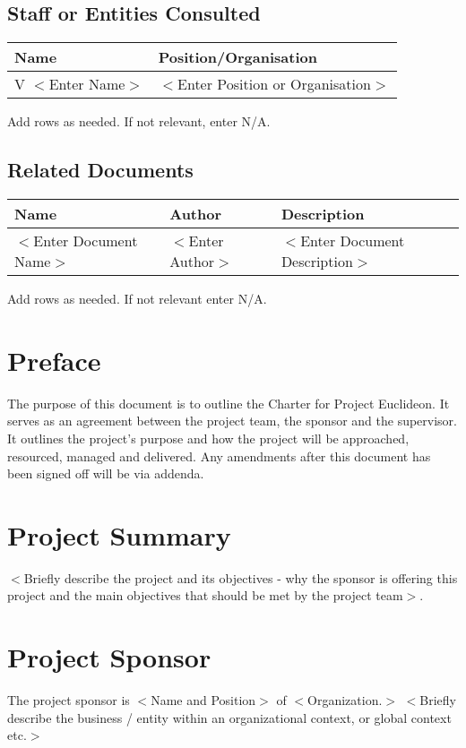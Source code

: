 \documentclass[a4paper]{article}
\def\project{Euclideon}
\begin{document}
\subsection*{Staff or Entities Consulted}
\begin{tabularx}{\textwidth}{|X|X|}
  \hline\rowcolor{table_header} Name & Position/Organisation\\
  \hline V $<$Enter Name$>$ & $<$Enter Position or Organisation$>$\\
\hline\end{tabularx}
Add rows as needed. If not relevant, enter N/A.
\subsection*{Related Documents}
\begin{tabularx}{\textwidth}{|X|X|X|}
  \hline\rowcolor{table_header} Name & Author & Description\\
  \hline $<$Enter Document Name$>$ & $<$Enter Author$>$ & $<$Enter Document Description$>$\\
\hline\end{tabularx}
Add rows as needed. If not relevant enter N/A.

\newpage
\section*{Preface}
The purpose of this document is to outline the Charter for Project \project. It serves as an agreement between the project team, the sponsor and the supervisor. It outlines the project’s purpose and how the project will be approached, resourced, managed and delivered.  Any amendments after this document has been signed off will be via addenda.

\tableofcontents
\newpage

\section{Project Summary}
$<$Briefly describe the project and its objectives - why the sponsor is offering this project and the main objectives that should be met by the project team$>$.

\section{Project Sponsor}
The project sponsor is $<$Name and Position$>$ of $<$Organization.$>$ $<$Briefly describe the business / entity within an organizational context, or global context etc.$>$
\end{document}
